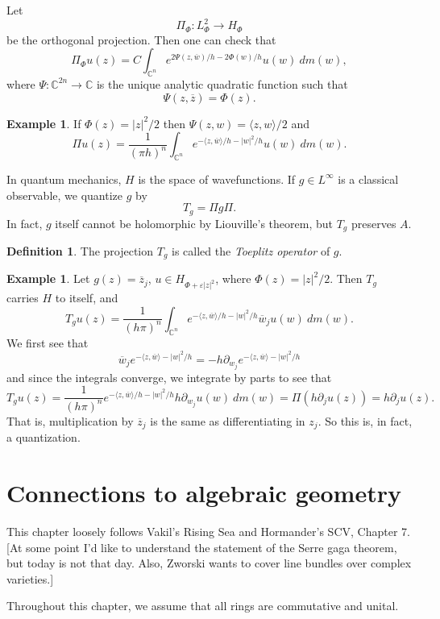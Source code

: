 \documentclass[12pt]{report}
\newcommand{\CC}{\mathbb{C}}
\newcommand{\dfn}[1]{\emph{#1}\index{#1}}
\theoremstyle{definition}
\newtheorem{definition}[theorem]{Definition}
\newtheorem{example}[theorem]{Example}
\begin{document}
Let
$$\Pi_\Phi: L^2_\Phi \to H_\Phi$$
be the orthogonal projection. Then one can check that
$$\Pi_\Phi u(z) = C \int_{\CC^n} e^{2\Psi(z, \overline w)/h - 2\Phi(w)/h} u(w) ~dm(w),$$
where $\Psi: \CC^{2n} \to \CC$ is the unique analytic quadratic function such that
$$\Psi(z, \overline z) = \Phi(z).$$
\begin{example}
    If $\Phi(z) = |z|^2/2$ then $\Psi(z, w) = \langle z, w\rangle/2$ and
$$\Pi u(z) = \frac{1}{(\pi h)^n} \int_{\CC^n} e^{-\langle z, \overline w\rangle/h - |w|^2/h}u(w) ~dm(w).$$
\end{example}
    In quantum mechanics, $H$ is the space of wavefunctions. If $g \in L^\infty$ is a classical observable, we quantize $g$ by
    $$T_g = \Pi g \Pi.$$
    In fact, $g$ itself cannot be holomorphic by Liouville's theorem, but $T_g$ preserves $A$.
\begin{definition}
    The projection $T_g$ is called the \dfn{Toeplitz operator} of $g$.
\end{definition}
\begin{example}
    Let $g(z) = \overline z_j$, $u \in H_{\Phi + \varepsilon|z|^2}$, where $\Phi(z) = |z|^2/2$. Then $T_g$ carries $H$ to itself, and
    $$T_gu(z) = \frac{1}{(h\pi)^n} \int_{\CC^n} e^{-\langle z, \overline w \rangle/h - |w|^2/h} \overline w_j u(w) ~dm(w).$$
    We first see that
    $$\overline w_j e^{-\langle z, \overline w\rangle - |w|^2/h} = -h\partial_{w_j} e^{-\langle z, \overline w\rangle - |w|^2/h}$$
    and since the integrals converge, we integrate by parts to see that
    $$T_gu(z) = \frac{1}{(h\pi)^n} e^{-\langle z, \overline w\rangle/h - |w|^2/h} h\partial_{w_j}u(w) ~dm(w) = \Pi(h\partial_ju(z)) = h\partial_j u(z).$$
    That is, multiplication by $\overline z_j$ is the same as differentiating in $z_j$. So this is, in fact, a quantization.
\end{example}



    
\chapter{Connections to algebraic geometry}
This chapter loosely follows Vakil's Rising Sea and Hormander's SCV, Chapter 7. [At some point I'd like to understand the statement of the Serre gaga theorem, but today is not that day. Also, Zworski wants to cover line bundles over complex varieties.]

Throughout this chapter, we assume that all rings are commutative and unital.
\end{document}
